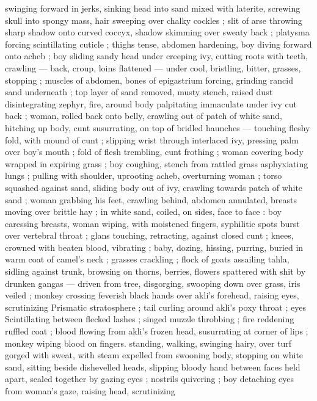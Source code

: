 {swinging forward in jerks, sinking head into sand mixed with laterite, 
screwing skull into spongy mass, hair sweeping over chalky cockles 
; slit of arse throwing sharp shadow onto curved coccyx, shadow 
skimming over sweaty back ; platysma forcing scintillating cuticle ; 
thighs tense, abdomen hardening, boy diving forward onto acheb ; 
boy sliding sandy head under creeping ivy, cutting roots with teeth, 
crawling --- back, croup, loins flattened --- under cool, bristling, 
bitter, grasses, stopping ; muscles of abdomen, bones of 
epigastrium forcing, grinding rancid sand underneath ; top layer of 
sand removed, musty stench, raised dust disintegrating zephyr, fire, 
around body palpitating immaculate under ivy cut back ; woman, 
rolled back onto belly, crawling out of patch of white sand, hitching 
up body, cunt susurrating, on top of bridled haunches --- touching 
fleshy fold, with mound of cunt ; slipping wrist through interlaced ivy, 
pressing palm over boy's mouth ; fold of flesh trembling, cunt 
frothing ; woman covering body wrapped in expiring grass ; boy 
coughing, stench from rattled grass asphyxiating lungs ; pulling with 
shoulder, uprooting acheb, overturning woman ; torso squashed 
against sand, sliding body out of ivy, crawling towards patch of white 
sand ; woman grabbing his feet, crawling behind, abdomen 
annulated, breasts moving over brittle hay ; in white sand, coiled, on 
sides, face to face : boy caressing breasts, woman wiping, with 
moistened fingers, syphilitic spots burst over vertebral throat ; glans 
touching, retracting, against closed cunt ; knees, crowned with 
beaten blood, vibrating ; baby, dozing, hissing, purring, buried in 
warm coat of camel's neck ; grasses crackling ; flock of goats 
assailing tahla, sidling against trunk, browsing on thorns, berries, 
flowers spattered with shit by drunken gangas --- driven from tree, 
disgorging, swooping down over grass, iris veiled ; monkey crossing 
feverish black hands over akli's forehead, raising eyes, scrutinizing 
Prismatic stratosphere ; tail curling around akli's poxy throat ; eyes 
Scintillating between flecked lashes ; singed muzzle throbbing ; fire 
reddening ruffled coat ; blood flowing from akli's frozen head, 
susurrating at corner of lips ; monkey wiping blood on fingers. 
standing, walking, swinging hairy, over turf gorged with sweat, with 
steam expelled from swooning body, stopping on white sand, sitting 
beside dishevelled heads, slipping bloody hand between faces held 
apart, sealed together by gazing eyes ; nostrils quivering ; boy 
detaching eyes from woman's gaze, raising head, scrutinizing 
}
